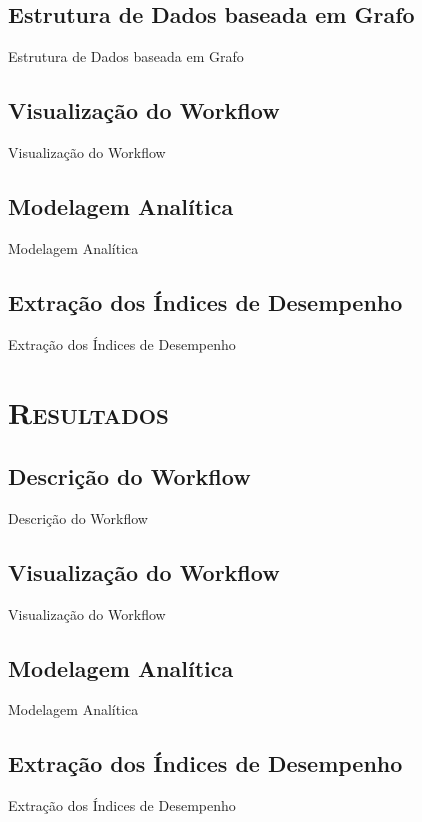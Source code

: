 \documentclass[xcolor=x11names,compress]{beamer}
\renewcommand{\(}{\begin{columns}}
\renewcommand{\)}{\end{columns}}
\newcommand{\<}[1]{\begin{column}{#1}}
\renewcommand{\>}{\end{column}}
\begin{document}
    \subsection{Estrutura de Dados baseada em Grafo}
    \begin{frame}{Estrutura de Dados baseada em Grafo}

    \end{frame}

    \subsection{Visualização do Workflow}
    \begin{frame}{Visualização do Workflow}

    \end{frame}

    \subsection{Modelagem Analítica}
    \begin{frame}{Modelagem Analítica}

    \end{frame}

    \subsection{Extração dos Índices de Desempenho}
    \begin{frame}{Extração dos Índices de Desempenho}

    \end{frame}

\section{\scshape Resultados}

    \subsection{Descrição do Workflow}
    \begin{frame}{Descrição do Workflow}

    \end{frame}

    \subsection{Visualização do Workflow}
    \begin{frame}{Visualização do Workflow}

    \end{frame}

    \subsection{Modelagem Analítica}
    \begin{frame}{Modelagem Analítica}

    \end{frame}

    \subsection{Extração dos Índices de Desempenho}
    \begin{frame}{Extração dos Índices de Desempenho}

    \end{frame}
\end{document}

